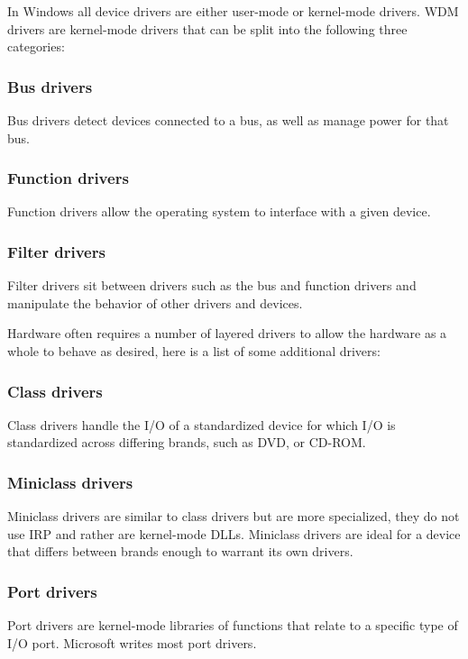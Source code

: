 \documentclass[letterpaper, 10pt, onecolumn, draftclsnofoot]{IEEEtran}
\begin{document}
In Windows all device drivers are either user-mode or kernel-mode drivers. WDM drivers are kernel-mode drivers that can be split into the following three categories:\cite{wi_p2}

\subsubsection{Bus drivers}
Bus drivers detect devices connected to a bus, as well as manage power for that bus.\cite{wi_p2}

\subsubsection{Function drivers}
Function drivers allow the operating system to interface with a given device.\cite{wi_p2}

\subsubsection{Filter drivers}
Filter drivers sit between drivers such as the bus and function drivers and manipulate the behavior of other drivers and devices.\cite{wi_p2}

Hardware often requires a number of layered drivers to allow the hardware as a whole to behave as desired, here is a list of some additional drivers:\cite{wi_p2}

\subsubsection{Class drivers}
Class drivers handle the I/O of a standardized device for which I/O is standardized across differing brands, such as DVD, or CD-ROM.\cite{wi_p2}

\subsubsection{Miniclass drivers}
Miniclass drivers are similar to class drivers but are more specialized, they do not use IRP and rather are kernel-mode DLLs. 
Miniclass drivers are ideal for a device that differs between brands enough to warrant its own drivers.\cite{wi_p2}

\subsubsection{Port drivers}
Port drivers are kernel-mode libraries of functions that relate to a specific type of I/O port. Microsoft writes most port drivers.\cite{wi_p2}
\end{document}
